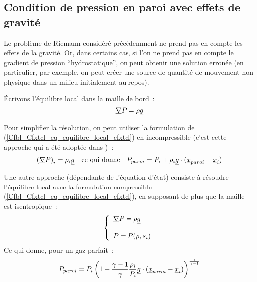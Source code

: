\subsection*{Condition de pression en paroi avec effets de gravité}

Le problème de Riemann considéré précédemment
ne prend pas en compte les effets de la gravité.
Or, dans certains cas, si l'on ne prend pas en compte le gradient de
pression ``hydrostatique'',  on peut obtenir une solution erronée
(en particulier, par exemple,
on peut créer une source de quantité de mouvement
non physique dans un milieu initialement au repos).

Écrivons l'équilibre local dans la maille de bord~:
\begin{equation}\label{Cfbl_Cfxtcl_eq_equilibre_local_cfxtcl}
\underline{\nabla}{P} = \rho \underline{g}
\end{equation}

Pour simplifier la résolution, on peut utiliser la formulation
de (\ref{Cfbl_Cfxtcl_eq_equilibre_local_cfxtcl}) en incompressible
(c'est cette approche qui a été adoptée dans \CS)~:
\begin{equation}\label{Cfbl_Cfxtcl_eq_equilibre_incompressible_cfxtcl}
\begin{array}{lll}
\left(\underline{\nabla}{P}\right)_i = \rho_i \underline{g}
& \text{ce qui donne}
& P_{paroi} = P_i + \rho_i \underline{g} \cdot (\underline{x}_{paroi} - \underline{x}_i)
\end{array}
\end{equation}


Une autre approche (dépendante de l'équation d'état)
consiste à résoudre l'équilibre local avec la formulation
compressible (\ref{Cfbl_Cfxtcl_eq_equilibre_local_cfxtcl}), en supposant de plus que
la maille est isentropique~:
\begin{equation}
\left\{\begin{array}{lll}
\underline{\nabla}{P} = \rho \underline{g}\\
\\
P = P(\rho,s_i)
\end{array}\right.
\end{equation}
Ce qui donne, pour un gaz parfait~:
\begin{equation}
\label{Cfbl_Cfxtcl_eq_equilibre_compressible_cfxtcl}
 P_{paroi} = P_i \left( 1+ \displaystyle\frac{\gamma -1}{\gamma}
\displaystyle\frac{\rho_i}{P_i} \underline{g} \cdot (\underline{x}_{paroi} - \underline{x}_i)
\right)^{\frac{\gamma}{\gamma -1}}
\end{equation}

